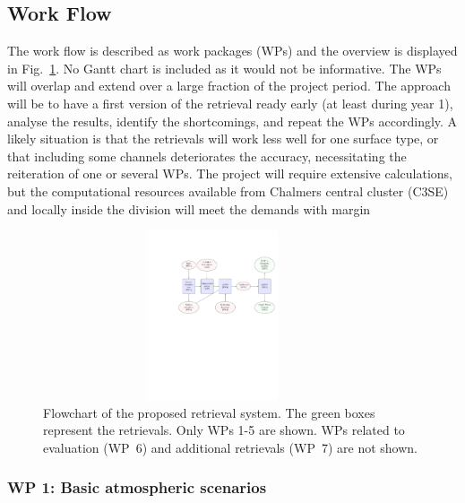 \documentclass[12pt,oneside,a4paper]{article}
\begin{document}
\subsection{Work Flow}
\label{sec:wp}


The work flow is described as work packages (WPs) and the overview is displayed
in Fig.~\ref{fig:flowchart}. No Gantt chart is included as it would not be
informative. The WPs will overlap and extend over a large fraction of the
project period. The approach will be to have a first version of the retrieval
ready early (at least during year 1), analyse the results, identify the
shortcomings, and repeat the WPs accordingly. A likely situation is that the
retrievals will work less well for one surface type, or that including some
channels deteriorates the accuracy, necessitating the reiteration of one or
several WPs. The project will require extensive calculations, but the
computational resources available from Chalmers central cluster (C3SE) and
locally inside the division will meet the demands with margin

\begin{figure}
	\begin{minipage}[c]{0.75\textwidth}
		\includegraphics[trim=100 400 15 125,clip,height = 50mm, width=100mm]{flowchart.pdf}
	\end{minipage}\hfill
	\begin{minipage}[c]{0.24\textwidth}
      \caption{Flowchart of the proposed retrieval system. The green boxes
        represent the retrievals. Only WPs 1-5 are shown. WPs related to
        evaluation (WP~6) and additional retrievals (WP~7) are not shown.
      } \label{fig:flowchart}
	\end{minipage}
\end{figure}

\vspace{-1ex}
\subsubsection*{WP 1: Basic atmospheric scenarios}
%
\end{document}
